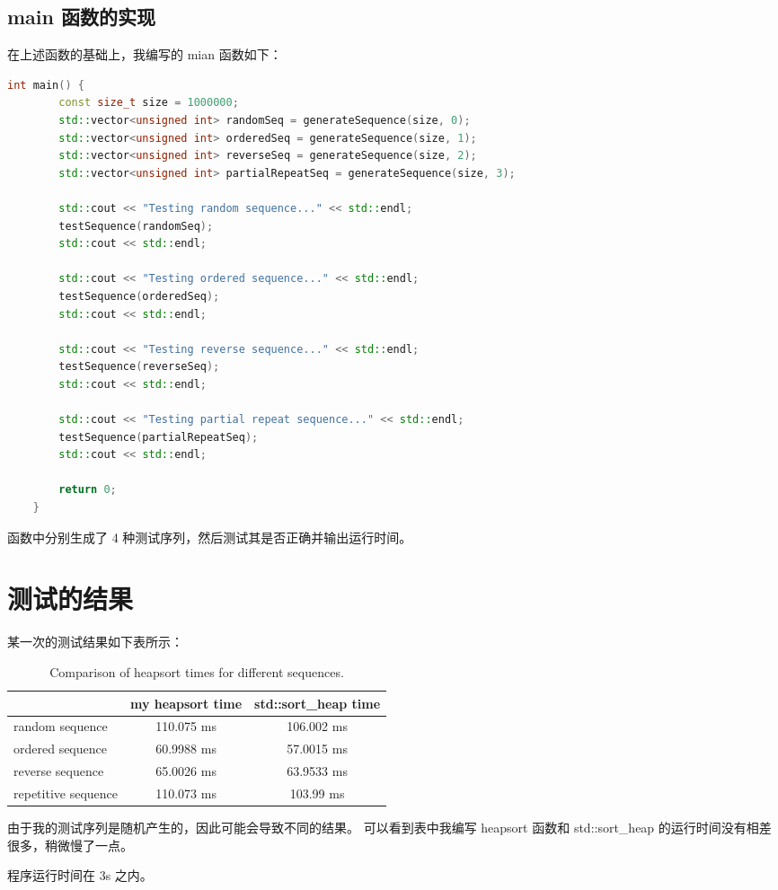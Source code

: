 \documentclass[UTF8]{ctexart}
\begin{document}
\subsection{main 函数的实现}
在上述函数的基础上，我编写的 mian 函数如下：
\begin{lstlisting}[language=c++, breaklines=true, keywordstyle=\color{blue!70}, commentstyle=\color{red!50!green!50!blue!50}, frame=shadowbox, rulesepcolor=\color{red!20!green!20!blue!20}]
    int main() {
        const size_t size = 1000000;
        std::vector<unsigned int> randomSeq = generateSequence(size, 0);
        std::vector<unsigned int> orderedSeq = generateSequence(size, 1);
        std::vector<unsigned int> reverseSeq = generateSequence(size, 2);
        std::vector<unsigned int> partialRepeatSeq = generateSequence(size, 3);
    
        std::cout << "Testing random sequence..." << std::endl;
        testSequence(randomSeq);
        std::cout << std::endl; 
    
        std::cout << "Testing ordered sequence..." << std::endl;
        testSequence(orderedSeq);
        std::cout << std::endl; 
    
        std::cout << "Testing reverse sequence..." << std::endl;
        testSequence(reverseSeq);
        std::cout << std::endl; 
    
        std::cout << "Testing partial repeat sequence..." << std::endl;
        testSequence(partialRepeatSeq);
        std::cout << std::endl; 
    
        return 0;
    }
\end{lstlisting}

函数中分别生成了 4 种测试序列，然后测试其是否正确并输出运行时间。

\section{测试的结果}

某一次的测试结果如下表所示：
\begin{table}[h!]
    \begin{center}
        \caption{Comparison of heapsort times for different sequences.}
        \begin{tabular}{l|c|c} 
            \textbf{ } & \textbf{my heapsort time} & \textbf{std::sort\_heap time}\\
            \hline
            random sequence & 110.075 ms & 106.002 ms \\
            ordered sequence & 60.9988 ms & 57.0015 ms \\
            reverse sequence & 65.0026 ms & 63.9533 ms \\
            repetitive sequence & 110.073 ms & 103.99 ms \\
        \end{tabular}
    \end{center}
\end{table}

由于我的测试序列是随机产生的，因此可能会导致不同的结果。
可以看到表中我编写 heapsort 函数和 std::sort\_heap 的运行时间没有相差很多，稍微慢了一点。

程序运行时间在 3s 之内。
\end{document}
